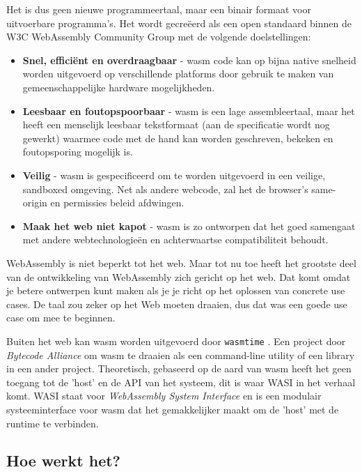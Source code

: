 Het is dus geen nieuwe programmeertaal, maar een binair formaat voor uitvoerbare programma’s. Het
wordt gecreëerd als een open standaard binnen de W3C WebAssembly Community Group met de volgende
doelstellingen: 
\begin{itemize}
  \item \textbf{Snel, efficiënt en overdraagbaar} - wasm code kan op bijna native snelheid worden
    uitgevoerd op verschillende platforms door gebruik te maken van gemeenschappelijke hardware
    mogelijkheden. 

  \item \textbf{Leesbaar en foutopspoorbaar} - wasm is een lage assembleertaal, maar het heeft een
    menselijk leesbaar tekstformaat (aan de specificatie wordt nog gewerkt) waarmee code met de hand
    kan worden geschreven, bekeken en foutopsporing mogelijk is. 

  \item \textbf{Veilig} - wasm is gespecificeerd om te worden uitgevoerd in een veilige, sandboxed
    omgeving. Net als andere webcode, zal het de browser's same-origin en permissies beleid
    afdwingen. 

  \item \textbf{Maak het web niet kapot} - wasm is zo ontworpen dat het goed samengaat met andere
    webtechnologieën en achterwaartse compatibiliteit behoudt.
\end{itemize}

WebAssembly is niet beperkt tot het web. Maar tot nu toe heeft het grootste deel van de
ontwikkeling van WebAssembly zich gericht op het web. Dat komt omdat je betere ontwerpen kunt maken
als je je richt op het oplossen van concrete use cases. De taal zou zeker op het Web moeten draaien,
dus dat was een goede use case om mee te beginnen. \cite{wasm_interfaces}

\clearpage

Buiten het web kan wasm worden uitgevoerd door \texttt{wasmtime} \cite{wasm_time}. Een
project door \textit{Bytecode Alliance} om wasm te draaien als een command-line utility of een
library in een ander project. Theoretisch, gebaseerd op de aard van wasm heeft het geen toegang tot
de 'host' en de API van het systeem, dit is waar WASI in het verhaal komt. WASI staat voor
\textit{WebAssembly System Interface} en is een modulair systeeminterface voor wasm dat het
gemakkelijker maakt om de 'host' met de runtime te verbinden.\cite{wasi}

\subsection{Hoe werkt het?}

